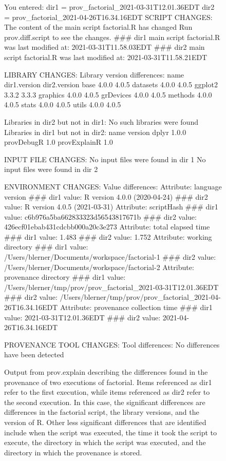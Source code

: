 \begin{figure}[p]
\begin{example}
You entered:
dir1 = prov_factorial_2021-03-31T12.01.36EDT 
dir2 = prov_factorial_2021-04-26T16.34.16EDT
SCRIPT CHANGES: The content of the main script factorial.R has changed
Run prov.diff.script to see the changes.
### dir1 main script factorial.R was last modified at: 2021-03-31T11.58.03EDT
### dir2 main script factorial.R was last modified at: 2021-03-31T11.58.21EDT

LIBRARY CHANGES: 
Library version differences:
      name dir1.version dir2.version
      base        4.0.0        4.0.5
  datasets        4.0.0        4.0.5
   ggplot2        3.3.2        3.3.3
  graphics        4.0.0        4.0.5
 grDevices        4.0.0        4.0.5
   methods        4.0.0        4.0.5
     stats        4.0.0        4.0.5
     utils        4.0.0        4.0.5

Libraries in dir2 but not in dir1: No such libraries were found
Libraries in dir1 but not in dir2:
         name version
        dplyr   1.0.0
   provDebugR     1.0
 provExplainR     1.0

INPUT FILE CHANGES:
No input files were found in dir 1
No input files were found in dir 2

ENVIRONMENT CHANGES: Value differences: 
Attribute: language version 
### dir1 value: R version 4.0.0 (2020-04-24) 
### dir2 value: R version 4.0.5 (2021-03-31) 
Attribute: scriptHash 
### dir1 value: c6b976a5ba662833323d56543817671b 
### dir2 value: 426ecf01ebab431cdcbb000a20c3e273 
Attribute: total elapsed time 
### dir1 value: 1.483 
### dir2 value: 1.752 
Attribute: working directory 
### dir1 value: /Users/blerner/Documents/workspace/factorial-1 
### dir2 value: /Users/blerner/Documents/workspace/factorial-2 
Attribute: provenance directory 
### dir1 value: /Users/blerner/tmp/prov/prov_factorial_2021-03-31T12.01.36EDT 
### dir2 value: /Users/blerner/tmp/prov/prov_factorial_2021-04-26T16.34.16EDT 
Attribute: provenance collection time 
### dir1 value: 2021-03-31T12.01.36EDT 
### dir2 value: 2021-04-26T16.34.16EDT 

PROVENANCE TOOL CHANGES: Tool differences: No differences have been detected
\end{example}
    \caption{Output from prov.explain describing the differences found in the provenance of two executions of factorial.  Items referenced as dir1 refer to the first execution, while items referenced as dir2 refer to the second execution.  In this case, the significant differences are differences in the factorial script, the library versions, and the version of R. Other less significant differences that are identified include when the script was executed, the time it took the script to execute, the directory in which the script was executed, and the directory in which the provenance is stored.}
    \label{listing:explain-output}
\end{figure}

